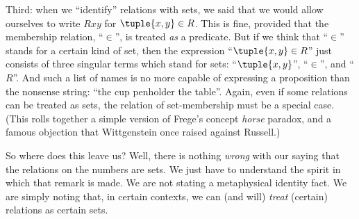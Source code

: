 \documentclass[../../../include/open-logic-section]{subfiles}
\begin{document}
Third: when we ``identify'' relations with sets, we said that we would
allow ourselves to write $Rxy$ for $\tuple{x,y} \in R$. This is fine,
provided that the membership relation, ``$\in$'', is treated \emph{as}
a predicate. But if we think that ``$\in$'' stands for a certain kind
of set, then the expression ``$\tuple{x,y} \in R$'' just consists of
three singular terms which stand for sets: ``$\tuple{x,y}$'',
``$\in$'', and ``$R$''. And such a list of names is no more capable of
expressing a proposition than the nonsense string: ``the cup penholder
the table''. Again, even if some relations can be treated as sets, the
relation of set-membership must be a special case. (This rolls
together a simple version of Frege's concept \emph{horse} paradox, and
a famous objection that Wittgenstein once raised against Russell.)

So where does this leave us? Well, there is nothing \emph{wrong} with
our saying that the relations on the numbers are sets. We just have to
understand the spirit in which that remark is made. We are not stating
a metaphysical identity fact. We are simply noting that, in certain
contexts, we can (and will) \emph{treat} (certain) relations as
certain sets.
\end{document}
